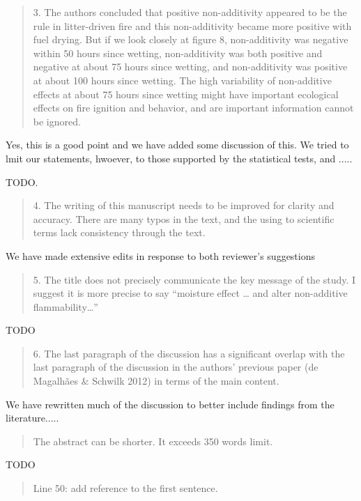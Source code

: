 \documentclass[letterpaper, 12pt]{letter}
\begin{document}
\begin{letter}{}
\begin{quote}
3. The authors concluded that positive non-additivity appeared to be the rule in litter-driven fire and this non-additivity became more positive with fuel drying. But if we look closely at figure 8, non-additivity was negative within 50 hours since wetting, non-additivity was both positive and negative at about 75 hours since wetting, and non-additivity was positive at about 100 hours since wetting. The high variability of non-additive effects at about 75 hours since wetting might have important ecological effects on fire ignition and behavior, and are important information cannot be ignored.
\end{quote}


Yes, this is a good point and we have added some discussion of this.  We tried to lmit our statements, hwoever, to those supported by the statistical tests, and .....

TODO.

\begin{quote}
4. The writing of this manuscript needs to be improved for clarity and accuracy. There are many typos in the text, and the using to scientific terms lack consistency through the text.
\end{quote}

We have made extensive edits in response to both reviewer's suggestions

\begin{quote}
5. The title does not precisely communicate the key message of the study. I suggest it is more precise to say “moisture effect … and alter non-additive flammability…”
\end{quote}

TODO

\begin{quote}
6. The last paragraph of the discussion has a significant overlap with the last paragraph of the discussion in the authors’ previous paper (de Magalhães \& Schwilk 2012) in terms of the main content.
\end{quote}

We have rewritten much of the discussion to better include findings from the literature.....

\begin{quote}
The abstract can be shorter. It exceeds 350 words limit. 
\end{quote}

TODO

\begin{quote}
Line 50: add reference to the first sentence.
\end{quote}


\end{letter}
\end{document}

